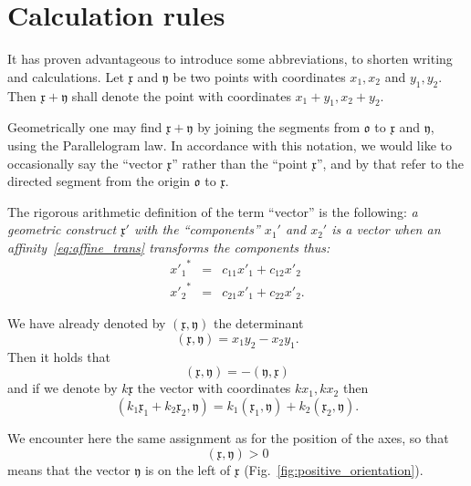 \documentclass[11pt]{book} \usepackage{amssymb}
\newcommand{\myvec}[1]{\mathfrak{#1}}
\newcommand{\vecx}{\myvec{x}}
\newcommand{\vecy}{\myvec{y}}
\begin{document}
\section{Calculation rules}
\label{section:calculation_rules}
It has proven advantageous to introduce some abbreviations, to shorten
writing and calculations. Let $\vecx$ and $\vecy$ be two points with
coordinates $x_1,x_2$ and $y_1,y_2$. Then $\vecx+\vecy$ shall denote
the point with coordinates $x_1+y_1,x_2+y_2$. 

Geometrically one may find $\vecx+\vecy$ by joining the segments from
$\myvec{o}$ to $\vecx$ and $\vecy$, using the Parallelogram law. In
accordance with this notation, we would like to occasionally say the
``vector $\vecx$'' rather than the ``point $\vecx$'', and by that refer
to the directed segment from the origin $\myvec{o}$ to $\vecx$.

The rigorous arithmetic definition of the term ``vector'' is the following:
{\em a geometric construct $\vecx'$ with the ``components'' $x_1'$ and
$x_2'$ is a vector when an affinity~\eqref{eq:affine_trans} transforms the
components thus:}
\begin{equation}
  \label{eq:vector_def}
  \begin{array}{rcl}
    {x'_1}^* &=& c_{11}x'_1+c_{12}x'_2\\
    {x'_2}^* &=& c_{21}x'_1+c_{22}x'_2.
  \end{array}  
\end{equation}

We have already denoted by $(\vecx,\vecy)$ the determinant
\begin{equation}
  \label{eq:det_redefined}
  (\vecx,\vecy)=x_1y_2-x_2y_1.
\end{equation}
Then it holds that
\begin{equation}
  \label{eq:det_antisymmetric}
  (\vecx,\vecy)=-(\vecy,\vecx)
\end{equation}
and if we denote by $k\vecx$ the vector with coordinates $kx_1,kx_2$ then
\begin{equation}
  \label{eq:det_bilinear}
  (k_1\vecx_1+k_2\vecx_2,\vecy)=k_1(\vecx_1,\vecy)+k_2(\vecx_2,\vecy).
\end{equation}

We encounter here the same assignment as for the position of the axes, so that
\begin{equation}
  (\vecx,\vecy) > 0
\end{equation}
means that the vector $\vecy$ is on the left of $\vecx$ 
(Fig.~\ref{fig:positive_orientation}).
\end{document}
